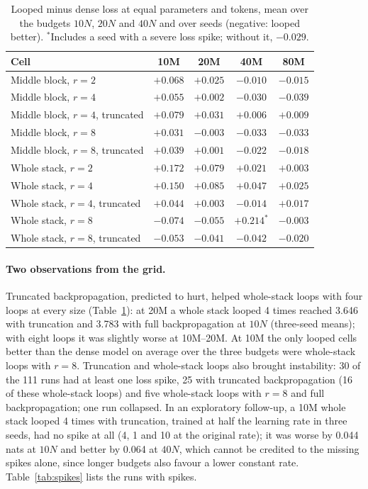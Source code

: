 \begin{table}[h]
  \centering
  \caption{Looped minus dense loss at equal parameters and tokens, mean over the budgets $10N$, $20N$ and $40N$ and over
  seeds (negative: looped better). $^{*}$Includes a seed with a severe loss spike; without it, $-0.029$.}
  \label{tab:gaps}
  \small
  \begin{tabular}{lcccc}
    \toprule
    Cell & 10M & 20M & 40M & 80M \\
    \midrule
    Middle block, $r=2$ & $+0.068$ & $+0.025$ & $-0.010$ & $-0.015$ \\
    Middle block, $r=4$ & $+0.055$ & $+0.002$ & $-0.030$ & $-0.039$ \\
    Middle block, $r=4$, truncated & $+0.079$ & $+0.031$ & $+0.006$ & $+0.009$ \\
    Middle block, $r=8$ & $+0.031$ & $-0.003$ & $-0.033$ & $-0.033$ \\
    Middle block, $r=8$, truncated & $+0.039$ & $+0.001$ & $-0.022$ & $-0.018$ \\
    Whole stack, $r=2$ & $+0.172$ & $+0.079$ & $+0.021$ & $+0.003$ \\
    Whole stack, $r=4$ & $+0.150$ & $+0.085$ & $+0.047$ & $+0.025$ \\
    Whole stack, $r=4$, truncated & $+0.044$ & $+0.003$ & $-0.014$ & $+0.017$ \\
    Whole stack, $r=8$ & $-0.074$ & $-0.055$ & $+0.214^{*}$ & $-0.003$ \\
    Whole stack, $r=8$, truncated & $-0.053$ & $-0.041$ & $-0.042$ & $-0.020$ \\
    \bottomrule
  \end{tabular}
\end{table}

\paragraph{Two observations from the grid.} Truncated backpropagation, predicted to hurt, helped whole-stack loops with
four loops at every size (Table~\ref{tab:gaps}): at 20M a whole stack looped 4 times reached 3.646 with truncation and
3.783 with full backpropagation at $10N$ (three-seed means); with eight loops it was slightly worse at 10M--20M. At 10M
the only looped cells better than the dense model on average over the three budgets were whole-stack loops with
$r = 8$. Truncation and whole-stack loops also brought instability: 30 of the 111 runs had at least one loss spike, 25
with truncated backpropagation (16 of these whole-stack loops) and five whole-stack loops with $r = 8$ and full
backpropagation; one run collapsed. In an exploratory follow-up, a 10M whole stack looped 4 times with truncation,
trained at half the learning rate in three seeds, had no spike at all (4, 1 and 10 at the original rate); it was worse
by 0.044 nats at $10N$ and better by 0.064 at $40N$, which cannot be credited to the missing spikes alone, since longer
budgets also favour a lower constant rate. Table~\ref{tab:spikes} lists the runs with spikes.

